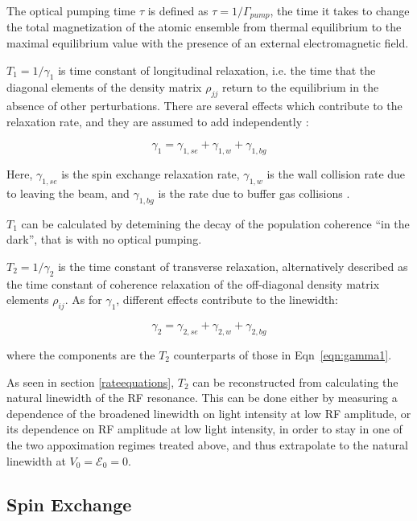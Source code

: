 The optical pumping time $\tau$ is defined as $\tau =
1/\Gamma_{pump}$, the time it takes to change the total magnetization
of the atomic ensemble from thermal equilibrium to the maximal
equilibrium value with the presence of an external electromagnetic
field. 

$T_1 = 1/\gamma_1$ is time constant of longitudinal relaxation,
i.e. the time that the diagonal elements of the density matrix
$\rho_{jj}$ return to the equilibrium in the absence of other
perturbations. There are several effects which contribute to the
relaxation rate, and they are assumed to add independently
\cite{vanier}:

\begin{equation}
\gamma_1 = \gamma_{1,se} + \gamma_{1,w} + \gamma_{1,bg} 
\label{eqn:gamma1}
\end{equation}

Here, $\gamma_{1,se}$ is the spin exchange relaxation rate,
$\gamma_{1,w}$ is the wall collision rate due to leaving the beam, and
$\gamma_{1,bg}$ is the rate due to buffer gas collisions
\cite{vanier}.

$T_1$ can be calculated by detemining the decay of the population
coherence ``in the dark'', that is with no optical pumping.

$T_2 = 1/\gamma_2$ is the time constant of transverse relaxation,
alternatively described as the time constant of coherence relaxation
of the off-diagonal density matrix elements $\rho_{ij}$. As for
$\gamma_1$, different effects contribute to the linewidth:

\begin{equation}
\gamma_2 = \gamma_{2,se} + \gamma_{2,w} + \gamma_{2,bg} 
\label{eqn:gamma2}
\end{equation} 
 
where the components are the $T_2$ counterparts of those in
Eqn~\ref{eqn:gamma1}.

As seen in section \ref{rateequations}, $T_2$ can be reconstructed
from calculating the natural linewidth of the RF resonance. This can
be done either by measuring a dependence of the broadened linewidth on
light intensity at low RF amplitude, or its dependence on RF amplitude
at low light intensity, in order to stay in one of the two
appoximation regimes treated above, and thus extrapolate to the
natural linewidth at $V_0 = \mathcal{E}_0 = 0$.

\subsection{Spin Exchange}\label{spinexchange}

